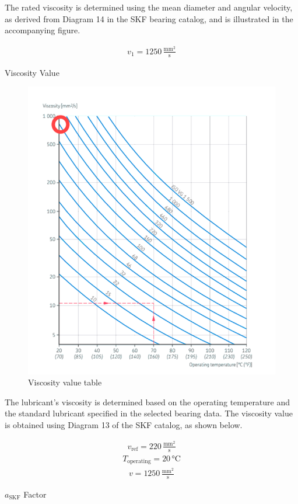 \documentclass[12pt]{report}
\begin{document}
The rated viscosity is determined using the mean diameter and angular velocity, as derived from Diagram 14 in the SKF bearing catalog, and is illustrated in the accompanying figure. 

\begin{align}
v_1 = 1250 \, \frac{\text{mm}^2}{\text{s}}
\end{align}

Viscosity Value

\begin{figure}[H]
    \centering
    \includegraphics[width=0.6\linewidth]{viscosityvalue.png}
    \caption{Viscosity value table}
    \label{fig:viscosityvalue}
\end{figure}

The lubricant's viscosity is determined based on the operating temperature and the standard lubricant specified in the selected bearing data. The viscosity value is obtained using Diagram 13 of the SKF catalog, as shown below.

\begin{align}
v_{\text{ref}} = 220 \, \frac{\text{mm}^2}{\text{s}}
\end{align}
\begin{align}
T_{\text{operating}} = 20 \, \text{°C}
\end{align}
\begin{align}
v = 1250 \, \frac{\text{mm}^2}{\text{s}}
\end{align}

\newpage

\( a_{\text{SKF}} \) Factor
\end{document}
